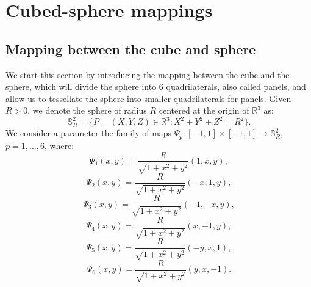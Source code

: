 \newpage
\section{Cubed-sphere mappings}
\label{cs-mappings}
\subsection{Mapping between the cube and sphere}
\label{equidistant-cs}
We start this section by introducing the mapping between the cube and the sphere, which will divide the sphere into 6 quadrilaterals, also called panels, and allow us to tessellate the sphere into smaller quadrilaterals for panels.
Given $R>0$, we denote the sphere of radius $R$ 
centered at the origin of  $\mathbb{R}^3$ as:
\begin{equation*}
	\mathbb{S}^2_R = \{ P = (X,Y,Z) \in \mathbb{R}^3: X^2 + Y^2 + Z^2 = R^2\}.
\end{equation*}
We consider a parameter %
the family of maps
$\Psi_{p}: [-1,1] \times [-1,1] \to \mathbb{S}^2_R$, $p=1, \ldots, 6$,
where:
\begin{equation*}
	\Psi_{1}(x,y) = \frac{R}{\sqrt{1 + x^2 + y^2}}(1, x, y), 
\end{equation*}
\begin{equation*}
	\Psi_{2}(x,y) = \frac{R}{\sqrt{1 + x^2 + y^2}}(-x, 1, y), 
\end{equation*}
\begin{equation*}
	\Psi_{3}(x,y) = \frac{R}{\sqrt{1 + x^2 + y^2}}(-1, -x, y), 
\end{equation*}
\begin{equation*}
	\Psi_{4}(x,y) = \frac{R}{\sqrt{1 + x^2 + y^2}}(x, -1, y), 
\end{equation*}
\begin{equation*}
	\Psi_{5}(x,y) = \frac{R}{\sqrt{1 + x^2 + y^2}}(-y, x, 1), 
\end{equation*}
\begin{equation*}
	\Psi_{6}(x,y) = \frac{R}{\sqrt{1 + x^2 + y^2}}(y, x, -1).
\end{equation*}


